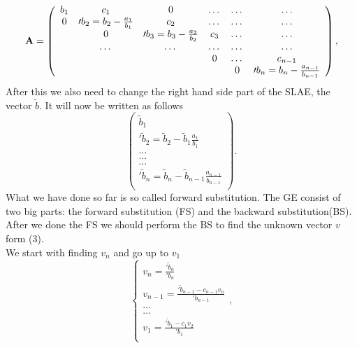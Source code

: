 \documentclass[10pt]{article}
\begin{document}
\begin{equation}
    {\bf A} = \left(\begin{array}{cccccc}
                             b_1& c_1 & 0 &\dots   & \dots &\dots \\
                           0 & \prime{b_2}=b_2-\frac{a_1}{b_1} & c_2 &\dots &\dots &\dots \\
                           & 0 & \prime{b_3}=b_3-\frac{a_2}{b_2} & c_3 & \dots & \dots \\
                           & \dots   & \dots &\dots   &\dots & \dots \\
                           &   &  &0  &\dots & c_{n-1} \\
                           &    &  &   &0 & \prime{b_n}=b_{n}-\frac{a_{n-1}}{b_{n-1}} \\
                      \end{array} \right),
\end{equation}
After this we also need to change the right hand side part of the SLAE, the vector $ \tilde{b} $. It will now be written as follows
\begin{equation}
\left(\begin{array}{c}
                           \tilde{b}_1\\
                           \prime{\tilde{b}_2}=\tilde{b}_2-\tilde{b}_1\frac{a_1}{b_1}\\
                           \dots \\
                           \dots \\
                          \dots \\
                           \prime{\tilde{b}_n}=\tilde{b}_n - \tilde{b}_{n-1}\frac{a_{n-1}}{b_{n-1}}\\
                      \end{array} \right).
\end{equation}
What we have done so far is so called forward substitution. The GE consist of two big parts: the forward substitution (FS) and the backward substitution(BS). After we done the FS we should perform the BS to find the unknown vector $ v $ form (3). \\
We start with finding $ v_{n} $ and go up to $ v_{1} $
\begin{equation}
\begin{cases}
v_{n}=  \frac{\prime{\tilde{b}_n}}{\prime{b}_n}\\ 
v_{n-1}=  \frac{\prime{\tilde{b}_{n-1}-c_{n-1}v_{n}}}{\prime{b}_{n-1}}  \\ 
\dots   \\ 
\dots  \\ 
v_{1}= \frac{\prime{\tilde{b}_{1}-c_{1}v_{2}}}{\prime{b}_{1}} \\
\end{cases},
\end{equation}
\end{document}
